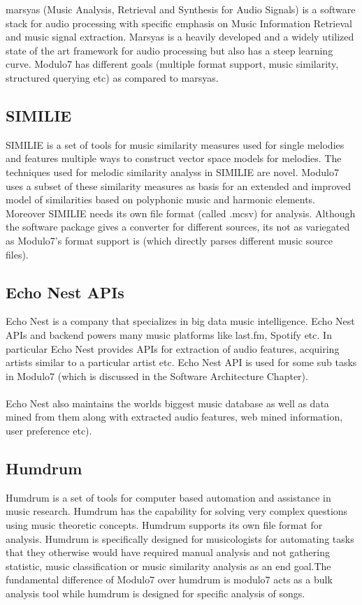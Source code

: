 \noindent marsyas \cite{marsyas} (Music Analysis, Retrieval and Synthesis for Audio Signals) is a software stack for audio processing with specific emphasis on Music Information Retrieval and music signal extraction. Marsyas is a heavily developed and a widely utilized state of the art framework for audio processing but also has a steep learning curve. Modulo7 has different goals (multiple format support, music similarity, structured querying etc) as compared to marsyas.

\subsection{SIMILIE}

\noindent SIMILIE \cite{similie} is a set of tools for music similarity measures used for single  melodies and features multiple ways to construct vector space models for melodies. The techniques used for melodic similarity analyss in SIMILIE are novel. Modulo7 uses a subset of these similarity measures as basis for an extended and improved model of similarities based on polyphonic music and harmonic elements. Moreover SIMILIE needs its own file format (called .mcsv) for analysis. Although the software package gives a converter for different sources, its not as variegated as Modulo7's format support is (which directly parses different music source files).

\subsection{Echo Nest APIs}

\noindent Echo Nest is a company that specializes in big data music intelligence. Echo Nest APIs and backend powers many music platforms like last.fm, Spotify etc. In particular Echo Nest provides APIs for extraction of audio features, acquiring artists similar to a particular artist etc. Echo Nest API is used for some sub tasks in Modulo7 (which is discussed in the Software Architecture Chapter). \\\\
Echo Nest also maintains the worlds biggest music database as well as data mined from them along with extracted audio features, web mined information, user preference etc). 

\subsection{Humdrum}

\noindent Humdrum \cite{humdrum} is a set of tools for computer based automation and assistance in music research. Humdrum has the capability for solving very complex questions using music theoretic concepts. Humdrum supports its own file format for analysis. Humdrum is specifically designed for musicologists for automating tasks that they otherwise would have required manual analysis and not gathering statistic, music classification or music similarity analysis as an end goal.The fundamental difference of Modulo7 over humdrum is modulo7 acts as a bulk analysis tool while humdrum is designed for specific analysis of songs.


